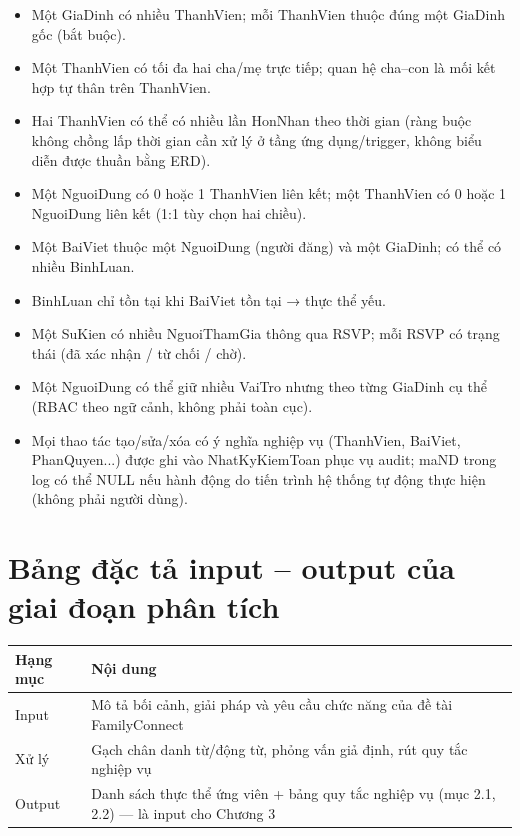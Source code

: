 \begin{itemize}
  \item Một GiaDinh có nhiều ThanhVien; mỗi ThanhVien thuộc đúng một GiaDinh gốc (bắt buộc).
  \item Một ThanhVien có tối đa hai cha/mẹ trực tiếp; quan hệ cha--con là mối kết hợp tự thân trên ThanhVien.
  \item Hai ThanhVien có thể có nhiều lần HonNhan theo thời gian (ràng buộc không chồng lấp thời gian cần xử lý ở tầng ứng dụng/trigger, không biểu diễn được thuần bằng ERD).
  \item Một NguoiDung có 0 hoặc 1 ThanhVien liên kết; một ThanhVien có 0 hoặc 1 NguoiDung liên kết (1:1 tùy chọn hai chiều).
  \item Một BaiViet thuộc một NguoiDung (người đăng) và một GiaDinh; có thể có nhiều BinhLuan.
  \item BinhLuan chỉ tồn tại khi BaiViet tồn tại → thực thể yếu.
  \item Một SuKien có nhiều NguoiThamGia thông qua RSVP; mỗi RSVP có trạng thái (đã xác nhận / từ chối / chờ).
  \item Một NguoiDung có thể giữ nhiều VaiTro nhưng theo từng GiaDinh cụ thể (RBAC theo ngữ cảnh, không phải toàn cục).
  \item Mọi thao tác tạo/sửa/xóa có ý nghĩa nghiệp vụ (ThanhVien, BaiViet, PhanQuyen...) được ghi vào NhatKyKiemToan phục vụ audit; maND trong log có thể NULL nếu hành động do tiến trình hệ thống tự động thực hiện (không phải người dùng).
\end{itemize}

\section{Bảng đặc tả input -- output của giai đoạn phân tích}

\begin{center}
\begin{tabularx}{\linewidth}{@{}l>{\raggedright\arraybackslash}X@{}}
\toprule
\textbf{Hạng mục} & \textbf{Nội dung} \\
\midrule
Input & Mô tả bối cảnh, giải pháp và yêu cầu chức năng của đề tài FamilyConnect \\
Xử lý & Gạch chân danh từ/động từ, phỏng vấn giả định, rút quy tắc nghiệp vụ \\
Output & Danh sách thực thể ứng viên + bảng quy tắc nghiệp vụ (mục 2.1, 2.2) --- là input cho Chương 3 \\
\bottomrule
\end{tabularx}
\end{center}

